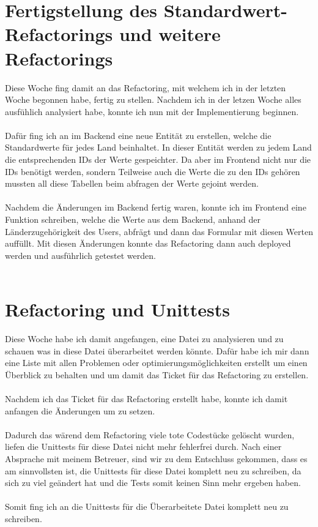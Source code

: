 \section{Fertigstellung des Standardwert-Refactorings und weitere Refactorings}
Diese Woche fing damit an das Refactoring, mit welchem ich in der letzten Woche begonnen habe, fertig zu stellen. Nachdem ich in der letzen Woche alles ausfühlich analysiert habe, konnte ich nun mit der Implementierung beginnen. \\\\
Dafür fing ich an im Backend eine neue Entität zu erstellen, welche die Standardwerte für jedes Land beinhaltet. In dieser Entität werden zu jedem Land die entsprechenden IDs der Werte gespeichter. Da aber im Frontend nicht nur die IDs benötigt werden, sondern Teilweise auch die Werte die zu den IDs gehören mussten all diese Tabellen beim abfragen der Werte gejoint werden. \\\\
Nachdem die Änderungen im Backend fertig waren, konnte ich im Frontend eine Funktion schreiben, welche die Werte aus dem Backend, anhand der Länderzugehörigkeit des Users, abfrägt und dann das Formular mit diesen Werten auffüllt. Mit diesen Änderungen konnte das Refactoring dann auch deployed werden und ausführlich getestet werden. \\\\

\section{Refactoring und Unittests}
Diese Woche habe ich damit angefangen, eine Datei zu analysieren und zu schauen was in diese Datei überarbeitet werden könnte. Dafür habe ich mir dann eine Liste mit allen Problemen oder optimierungsmöglichkeiten erstellt um einen Überblick zu behalten und um damit das Ticket für das Refactoring zu erstellen. \\\\
Nachdem ich das Ticket für das Refactoring erstellt habe, konnte ich damit anfangen die Änderungen um zu setzen. \\\\
Dadurch das wärend dem Refactoring viele tote Codestücke gelöscht wurden, liefen die Unittests für diese Datei nicht mehr fehlerfrei durch. Nach einer Absprache mit meinem Betreuer, sind wir zu dem Entschluss gekommen, dass es am sinnvollsten ist, die Unittests für diese Datei komplett neu zu schreiben, da sich zu viel geändert hat und die Tests somit keinen Sinn mehr ergeben haben. \\\\
Somit fing ich an die Unittests für die Überarbeitete Datei komplett neu zu schreiben. \\\\

